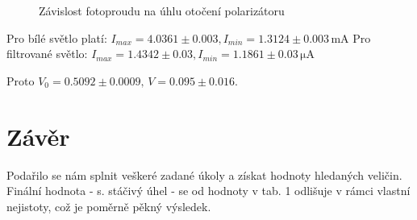 \documentclass[czech,11pt,a4paper]{article}
\begin{document}
\begin{multicols}{2}
\begin{center}
\begin{figure}[H]
		\caption{Závislost fotoproudu na úhlu otočení polarizátoru}
	\end{figure}
	Pro bílé světlo platí: $I_{max} = 4.0361 \pm 0.003, I_{min} = 1.3124 \pm 0.003 \,\mathrm{mA}$
	Pro filtrované světlo: $I_{max} = 1.4342 \pm 0.03, I_{min} = 1.1861  \pm 0.03 \,\mathrm{\mu A}$
	
	Proto $V_0 = 0.5092 \pm 0.0009, \, V = 0.095 \pm 0.016.$
		
	\end{center}
		\section{Závěr}
		Podařilo se nám splnit veškeré zadané úkoly a získat hodnoty hledaných veličin. Finální hodnota - s. stáčivý úhel - se od hodnoty v tab. 1 odlišuje v rámci vlastní nejistoty, což je poměrně pěkný výsledek. 
		
	
		

		
		
		
		
		
	\end{multicols}
\end{document}

